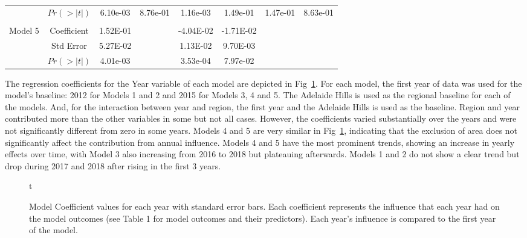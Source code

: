 \documentclass[10pt,letterpaper]{article}
\begin{document}
\begin{table}[!ht]
{\begin{tabular}{@{}cccccccc@{}}
   & $Pr(>|t|)$ & 6.10e-03 & 8.76e-01 & 1.16e-03 & 1.49e-01 & 1.47e-01 & 8.63e-01 \\
   &  &  &  &  &  &  &  \\
  \multirow{3}{*}{Model 5} 
   & Coefficient & 1.52E-01 &  & -4.04E-02 & -1.71E-02 &  &  \\
   & Std Error & 5.27E-02 &  & 1.13E-02 & 9.70E-03 &  & \\
   & $Pr(>|t|)$ & 4.01e-03 &  & 3.53e-04 & 7.97e-02 &  &  \\ \cmidrule(l){2-8} 
  \end{tabular}
  }
  \end{table}

The regression coefficients for the Year variable of each model are depicted in Fig~\ref{fig:yearly}. For each model, the first year of data was used for the model's baseline: 2012 for Models 1 and 2 and 2015 for Models 3, 4 and 5. The Adelaide Hills is used as the regional baseline for each of the models. And, for the interaction between year and region, the first year and the Adelaide Hills is used as the baseline. Region and year contributed more than the other variables in some but not all cases. However, the coefficients varied substantially over the years and were not significantly different from zero in some years. Models 4 and 5 are very similar in Fig~\ref{fig:yearly}, indicating that the exclusion of area does not significantly affect the contribution from annual influence. Models 4 and 5 have the most prominent trends, showing an increase in yearly effects over time, with Model 3 also increasing from 2016 to 2018 but plateauing afterwards. Models 1 and 2 do not show a clear trend but drop during 2017 and 2018 after rising in the first 3 years.
\par
\begin{figure}[!ht]
  \caption{Model Coefficient values for each year with standard error bars. Each coefficient represents the influence that each year had on the model outcomes (see Table 1 for model outcomes and their predictors). Each year's influence is compared to the first year of the model.}t\label{fig:yearly}
  \end{figure}
\end{document}
